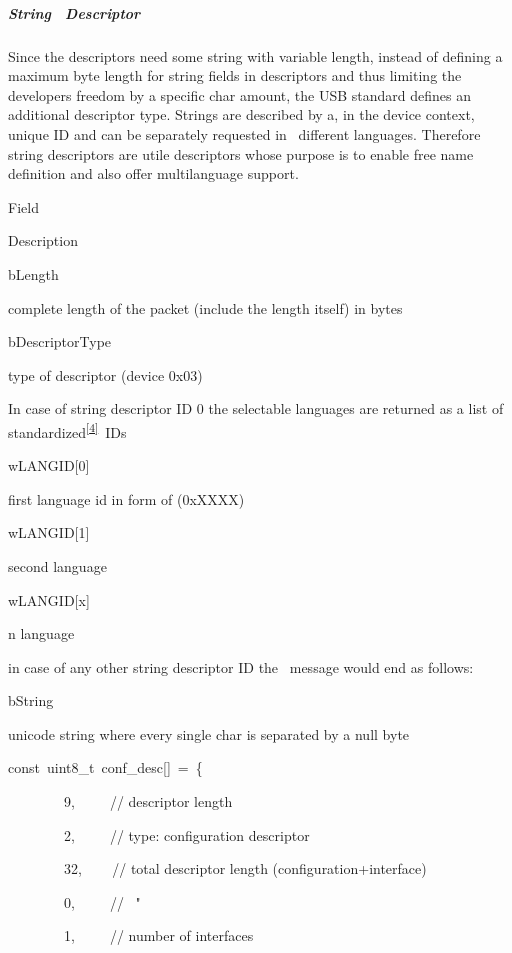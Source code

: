 \hypertarget{h.tyeikwcmymv0}{\subparagraph{\texorpdfstring{{String
~Descrip}{t}{or}}{String ~Descriptor}}\label{h.tyeikwcmymv0}}

{Since the descriptors need some string with variable length, instead of
defining a maximum byte length for string fields in descriptors and thus
limiting the developers freedom by a specific char amount, the USB
standard defines an additional descriptor type. Strings are described by
a, in the device context, unique ID and can be separately requested in
~different languages. Therefore string descriptors are utile descriptors
whose purpose is to enable free name definition and also offer
multilanguage support.}

\href{}{}\href{}{}

{Field}

{Description}

{bLength}

{complete length of the packet (include the length itself) in bytes}

{bDescriptorType}

{type of descriptor (device 0x03)}

{In case of string descriptor ID 0 the selectable languages are returned
as a list of
standardized}\textsuperscript{\protect\hyperlink{ftnt4}{{[}4{]}}}{~IDs}

{wLANGID{[}0{]}}

{first language id in form of (0xXXXX)}

{wLANGID{[}1{]}}

{second language}

{wLANGID{[}x{]}}

{n language }

{in case of any other string descriptor ID the ~message would end as
follows:}

{bString}

{unicode string where every single char is separated by a null byte}

{const}{~}{uint8\_t}{~conf\_desc}{{[}{]}}{~}{=}{~\{}

{~~~~~~~~}{9}{,}{~ ~ ~ }{// descriptor length}

{~~~~~~~~}{2}{,}{~ ~ ~ }{// type: configuration descriptor}

{~~~~~~~~}{32}{,}{~ ~ ~}{// total descriptor length
(configuration+interface)}

{~~~~~~~~}{0}{,}{~ ~ ~ }{// ~"}

{~~~~~~~~}{1}{,}{~ ~ ~ }{// number of interfaces}

